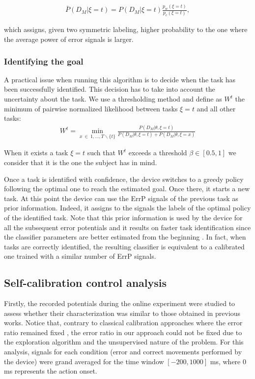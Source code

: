 \begin{eqnarray}
 \bar{P}(D_M | \xi=t) = P(D_M | \xi=t) \frac{p_w(\xi=t)}{p_c(\xi=t)},
\label{eq:power}
\end{eqnarray}

which assigns, given two symmetric labeling, higher probability to the one where the average power of error  signals is larger.  

\subsubsection{Identifying the goal}
\label{sec:confidence}
A practical issue when running this algorithm is to decide when the task has been successfully identified. This decision has to take into account the uncertainty about the task. We use a thresholding method and define as $W^{t}$ the minimum of pairwise normalized likelihood between tasks $\xi=t$ and all other tasks: 
%
\begin{eqnarray}
W^{t} = \min_{x~\in~{1, \ldots, T} \smallsetminus \{t\}} \frac{P(D_M | \theta, \xi=t)}{P(D_M | \theta, \xi=t) + P(D_M | \theta, \xi=x)}
\label{eq:weight}
\end{eqnarray}

When it exists a task $\xi=t$ such that $W^{t}$ exceeds a threshold $\beta \in [0.5,1]$ we consider that it is the one the subject has in mind.

Once a task is identified with confidence, the device switches to a greedy policy following the optimal one to reach the estimated goal. Once there, it starts a new task. At this point the device can use the ErrP signals of the previous task as prior information. Indeed, it assigns to the signals the labels of the optimal policy of the identified task.  Note that this prior information is used by the device for all the subsequent error potentials and it results on faster task identification since the classifier parameters are better estimated from the beginning \cite{grizou2014interactive}. In fact, when tasks are correctly identified, the resulting classifier is equivalent to a calibrated one trained with a similar number of ErrP signals. 

\subsection{Self-calibration control analysis}

Firstly, the recorded potentials during the online experiment were studied to assess whether their characterization was similar to those obtained in previous works. Notice that, contrary to classical calibration approaches where the error ratio remained fixed \cite{chavarriaga2010learning, iturrate13}, the error ratio in our approach could not be fixed due to the exploration algorithm and the unsupervised nature of the problem. For this analysis, signals for each condition (error and correct movements performed by the device) were grand averaged for the time window $[-200, 1000]$ ms, where 0 ms represents the action onset.

